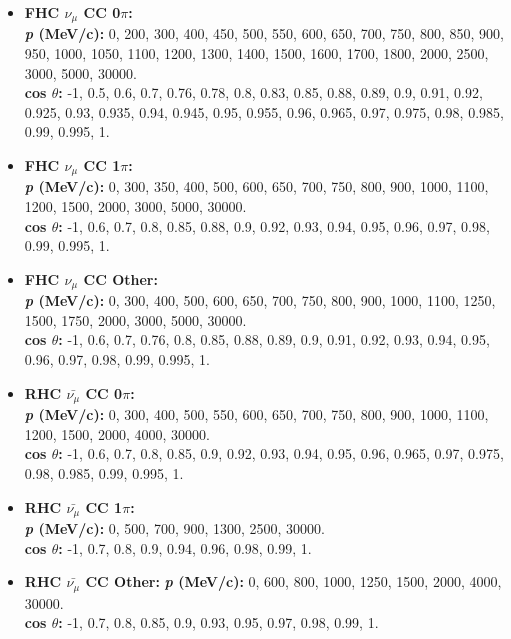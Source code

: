 \begin{itemize}

\item \textbf{FHC $\nu_{\mu}$ CC 0$\pi$:}\\
\textbf{\textit{p} (MeV/c):} 0, 200, 300, 400, 450, 500, 550, 600, 650, 700, 750, 800, 850, 900, 950, 1000, 1050, 1100, 1200, 1300, 1400, 1500, 1600, 1700, 1800, 2000, 2500, 3000, 5000, 30000.\\
\textbf{cos $\theta$:} -1, 0.5, 0.6, 0.7, 0.76, 0.78, 0.8, 0.83, 0.85, 0.88, 0.89, 0.9, 0.91, 0.92, 0.925, 0.93, 0.935, 0.94, 0.945, 0.95, 0.955, 0.96, 0.965, 0.97, 0.975, 0.98, 0.985, 0.99, 0.995, 1.

\item \textbf{FHC $\nu_{\mu}$ CC 1$\pi$:}\\
\textbf{\textit{p} (MeV/c):} 0, 300, 350, 400, 500, 600, 650, 700, 750, 800, 900, 1000, 1100, 1200, 1500, 2000, 3000, 5000, 30000.\\
\textbf{cos $\theta$:} -1, 0.6, 0.7, 0.8, 0.85, 0.88, 0.9, 0.92, 0.93, 0.94, 0.95, 0.96, 0.97, 0.98, 0.99, 0.995, 1.

\item \textbf{FHC $\nu_{\mu}$ CC Other:}\\
\textbf{\textit{p} (MeV/c):} 0, 300, 400, 500, 600, 650, 700, 750, 800, 900, 1000, 1100, 1250, 1500, 1750, 2000, 3000, 5000, 30000.\\
\textbf{cos $\theta$:} -1, 0.6, 0.7, 0.76, 0.8, 0.85, 0.88, 0.89, 0.9, 0.91, 0.92, 0.93, 0.94, 0.95, 0.96, 0.97, 0.98, 0.99, 0.995, 1.

\item \textbf{RHC $\bar{\nu_{\mu}}$ CC 0$\pi$:}\\
\textbf{\textit{p} (MeV/c):} 0, 300, 400, 500, 550, 600, 650, 700, 750, 800, 900, 1000, 1100, 1200, 1500, 2000, 4000, 30000.\\
\textbf{cos $\theta$:} -1, 0.6, 0.7, 0.8, 0.85, 0.9, 0.92, 0.93, 0.94, 0.95, 0.96, 0.965, 0.97, 0.975, 0.98, 0.985, 0.99, 0.995, 1.

\item \textbf{RHC $\bar{\nu_{\mu}}$ CC 1$\pi$:}\\
\textbf{\textit{p} (MeV/c):} 0, 500, 700, 900, 1300, 2500, 30000.\\
\textbf{cos $\theta$:}  -1, 0.7, 0.8, 0.9, 0.94, 0.96, 0.98, 0.99, 1.

\item \textbf{RHC $\bar{\nu_{\mu}}$ CC Other:}
\textbf{\textit{p} (MeV/c):} 0, 600, 800, 1000, 1250, 1500, 2000, 4000, 30000.\\
\textbf{cos $\theta$:} -1, 0.7, 0.8, 0.85, 0.9, 0.93, 0.95, 0.97, 0.98, 0.99, 1.


\end{itemize}
